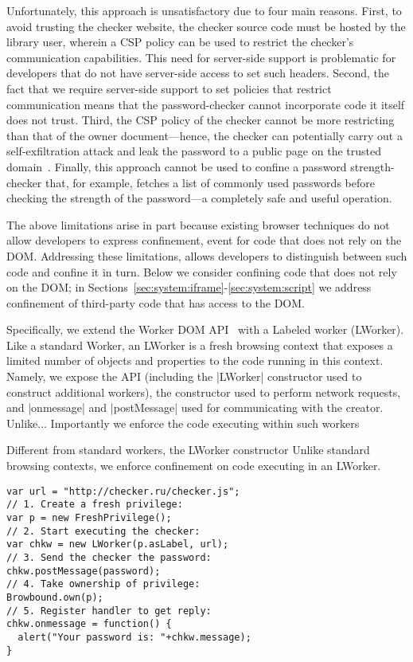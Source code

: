 Unfortunately, this approach is unsatisfactory due to four main reasons.
%
First, to avoid trusting the checker website, the checker source code
must be hosted by the library user, wherein a CSP policy can be used
to restrict the checker's communication capabilities. 
%
This need for server-side support is problematic for developers that
do not have server-side access to set such headers.
%
Second, the fact that we require server-side support to set policies
that restrict communication means that the password-checker cannot
incorporate code it itself does not trust.
%
Third, the CSP policy of the checker cannot be more restricting than
that of the owner document---hence, the checker can potentially carry
out a self-exfiltration attack and leak the password to a public page
on the trusted domain~.
%
Finally, this approach cannot be used to confine a password
strength-checker that, for example, fetches a list of commonly used
passwords before checking the strength of the password---a completely
safe and useful operation.

The above limitations arise in part because existing browser
techniques do not allow developers to express confinement, event for
code that does not rely on the DOM.
%
Addressing these limitations, \sys{} allows developers to distinguish
between such code and confine it in turn.
%
Below we consider confining code that does not rely on the DOM; in
Sections~\ref{sec:system:iframe}-\ref{sec:system:script} we
address confinement of third-party code that has access to the DOM.

Specifically, we extend the Worker DOM API~ with
a Labeled worker (LWorker).
%
Like a standard Worker, an LWorker is a fresh browsing context that
exposes a limited number of objects and properties to the code running
in this context.
%
Namely, we expose the \sys{} API (including the \js|LWorker|
constructor used to construct additional workers), the \xhr{}
constructor used to perform network requests, and \js|onmessage| and
\js|postMessage| used for communicating with the creator.
%
Unlike... Importantly we enforce the code executing within such workers

Different from standard workers, the LWorker constructor
Unlike standard browsing contexts, we enforce confinement on code
executing in an LWorker.

\begin{lstlisting}
var url = "http://checker.ru/checker.js";
// 1. Create a fresh privilege:
var p = new FreshPrivilege();
// 2. Start executing the checker:
var chkw = new LWorker(p.asLabel, url);
// 3. Send the checker the password:
chkw.postMessage(password);
// 4. Take ownership of privilege:
Browbound.own(p);
// 5. Register handler to get reply:
chkw.onmessage = function() {
  alert("Your password is: "+chkw.message);
}
\end{lstlisting}


